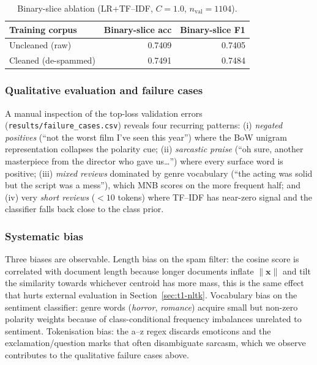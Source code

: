 \documentclass[11pt,a4paper]{article}
\begin{document}
\begin{table}[H]
 \centering
 \small
 \caption{Binary-slice ablation (LR+TF--IDF, \(C=1.0\),
 \(n_{\text{val}}=1104\)).}
 \label{tab:t1-ablation}
 \begin{tabular}{lrr}
 \toprule
 Training corpus & Binary-slice acc & Binary-slice F1 \\
 \midrule
 Uncleaned (raw) & 0.7409 & 0.7405 \\
 Cleaned (de-spammed) & 0.7491 & 0.7484 \\
 \bottomrule
 \end{tabular}
\end{table}

\subsubsection{Qualitative evaluation and failure cases}

A manual inspection of the top-loss validation errors
(\texttt{results/failure\_cases.csv}) reveals four recurring patterns:
(i) \emph{negated positives} (``not the worst film I've seen this
year'') where the BoW unigram representation collapses the polarity
cue; (ii) \emph{sarcastic praise} (``oh sure, another masterpiece from
the director who gave us\ldots'') where every surface word is
positive; (iii) \emph{mixed reviews} dominated by genre vocabulary
(``the acting was solid but the script was a mess''), which MNB scores
on the more frequent half; and (iv) very \emph{short reviews}
(\(<10\) tokens) where TF--IDF has near-zero signal and the classifier
falls back close to the class prior.

\subsubsection{Systematic bias}

Three biases are observable. Length bias on the spam filter:
the cosine score is correlated with document length because longer
documents inflate \(\|\bm{x}\|\) and tilt the similarity towards
whichever centroid has more mass, this is the same effect that
hurts external evaluation in Section~\ref{sec:t1-nltk}.
Vocabulary bias on the sentiment classifier: genre words
(\emph{horror}, \emph{romance}) acquire small but non-zero polarity
weights because of class-conditional frequency imbalances unrelated to
sentiment. Tokenisation bias: the a--z regex discards
emoticons and the exclamation/question marks that often disambiguate
sarcasm, which we observe contributes to the qualitative failure cases
above.
\end{document}
